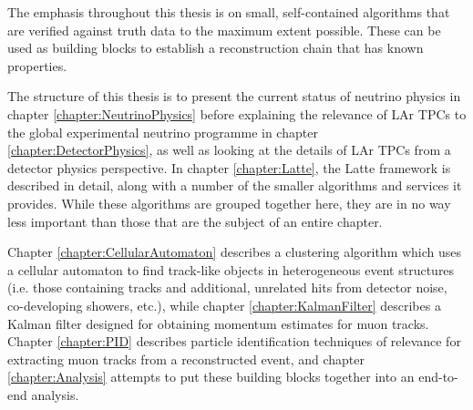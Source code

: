 The emphasis throughout this thesis is on small, self-contained algorithms that are verified against truth data to the maximum extent possible. These can be used as building blocks to establish a reconstruction chain that has known properties.

The structure of this thesis is to present the current status of neutrino physics in chapter \ref{chapter:NeutrinoPhysics} before explaining the relevance of \ac{LAr TPC}s to the global experimental neutrino programme in chapter \ref{chapter:DetectorPhysics}, as well as looking at the details of \ac{LAr TPC}s from a detector physics perspective. In chapter \ref{chapter:Latte}, the Latte framework is described in detail, along with a number of the smaller algorithms and services it provides. While these algorithms are grouped together here, they are in no way less important than those that are the subject of an entire chapter.

Chapter \ref{chapter:CellularAutomaton} describes a clustering algorithm which uses a cellular automaton to find track-like objects in heterogeneous event structures (i.e. those containing tracks and additional, unrelated hits from detector noise, co-developing showers, etc.), while chapter \ref{chapter:KalmanFilter} describes a Kalman filter designed for obtaining momentum estimates for muon tracks. Chapter \ref{chapter:PID} describes particle identification techniques of relevance for extracting muon tracks from a reconstructed event, and chapter \ref{chapter:Analysis} attempts to put these building blocks together into an end-to-end analysis.

